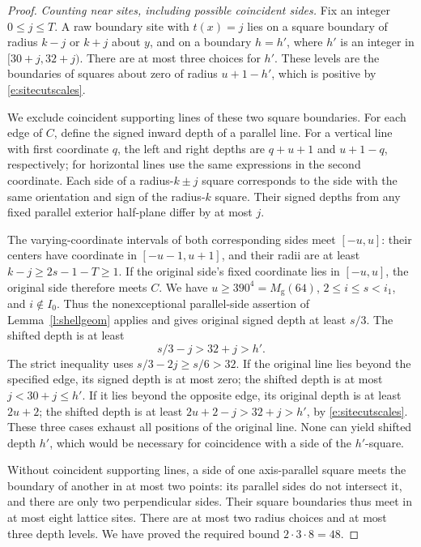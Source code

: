 \begin{proof}
\emph{Counting near sites, including possible coincident sides.}
Fix an integer \(0\le j\le T\).  A raw boundary site with
\(t(x)=j\) lies on a square boundary of radius \(k-j\) or
\(k+j\) about \(y\), and on a boundary \(h=h'\), where
\(h'\) is an integer in \([30+j,32+j)\).
There are at most three choices for \(h'\).  These levels
are the boundaries of squares about zero of radius \(u+1-h'\),
which is positive by \eqref{e:sitecutscales}.

We exclude coincident supporting lines of these two square
boundaries.  For each edge of \(C\), define the signed inward
depth of a parallel line.  For a vertical line with first
coordinate \(q\), the left and right depths are
\(q+u+1\) and \(u+1-q\), respectively; for horizontal lines
use the same expressions in the second coordinate.  Each side
of a radius-\(k\pm j\) square corresponds to the side with
the same orientation and sign of the radius-\(k\) square.
Their signed depths from any fixed parallel exterior half-plane
differ by at most \(j\).

The varying-coordinate intervals of both corresponding sides
meet \([-u,u]\): their centers have coordinate in
\([-u-1,u+1]\), and their radii are at least
\(k-j\ge2s-1-T\ge1\).
If the original side's fixed coordinate lies in \([-u,u]\),
the original side therefore meets \(C\).  We have
\(u\ge390^4=M_{\mathrm g}(64)\), \(2\le i\le s<i_1\), and
\(i\notin I_0\).  Thus the nonexceptional parallel-side assertion
of Lemma~\ref{l:shellgeom} applies and gives original signed depth
at least \(s/3\).  The shifted depth is at least
\[
                   s/3-j>32+j>h'.
\]
The strict inequality uses \(s/3-2j\ge s/6>32\).
If the original line lies beyond the specified edge, its signed
depth is at most zero; the shifted depth is at most
\(j<30+j\le h'\).  If it lies beyond the opposite edge,
its original depth is at least \(2u+2\); the shifted depth is
at least \(2u+2-j>32+j>h'\), by
\eqref{e:sitecutscales}.  These three cases exhaust all positions
of the original line.  None can yield shifted depth \(h'\),
which would be necessary for coincidence with a side of the
\(h'\)-square.

Without coincident supporting lines, a side of one axis-parallel
square meets the boundary of another in at most two points:
its parallel sides do not intersect it, and there are only two
perpendicular sides.  Their square boundaries thus meet in
at most eight lattice sites.  There are at most two radius
choices and at most three depth levels.  We have proved the
required bound \(2\cdot3\cdot8=48\).


\end{proof}

